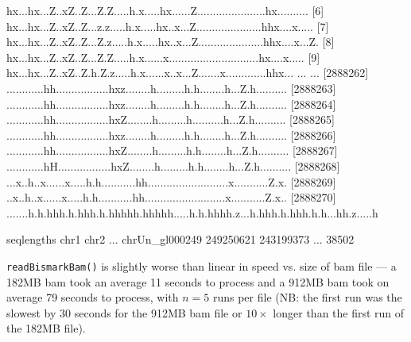 \documentclass[a4paper]{article}
\begin{document}
\begin{Schunk}
\begin{Soutput}
      [5] hx...hx...Z..xZ..Z...Z.Z.....h.x.....hx......Z......................hx..........
      [6] hx...hx...Z..xZ..Z...z.z.....h.x.....hx..x...Z.....................hhx....x.....
      [7] hx...hx...Z..xZ..Z...Z.z.....h.x.....hx..x...Z.....................hhx....x...Z.
      [8] hx...hx...Z..xZ..Z...Z.Z.....h.x......x.............................hx....x.....
      [9]        hx...hx...Z..xZ..Z.h.Z.z.....h.x......x..x...Z.......x.............hhx...
      ...                                                                              ...
[2888262] ............hh.................hxz........h.........h.h........h...Z.h..........
[2888263] ............hh.................hxz........h.........h.h........h...Z.h..........
[2888264] ............hh.................hxZ........h.........h..........h...Z.h..........
[2888265] ............hh.................hxz........h.........h.h........h...Z.h..........
[2888266] ............hh.................hxZ........h.........h.h........h...Z.h..........
[2888267] ............hH.................hxZ........h.........h.h........h...Z.h..........
[2888268] ...x..h..x......x.....h.h...........hh..........................x...........Z.x.
[2888269] ..x..h..x......x.....h.h...........hh..........................x...........Z.x..
[2888270] .......h.h.hhh.h.hhh.h.hhhhh.hhhhh.....h.h.hhhh.z...h.hhh.h.hhh.h.h...hh.z.....h

seqlengths
                  chr1                  chr2 ...        chrUn_gl000249
             249250621             243199373 ...                 38502
\end{Soutput}
\end{Schunk}
\texttt{readBismarkBam()} is slightly worse than linear in speed vs. size of bam file --- a 182MB bam took an average 11 seconds to process and a 912MB bam took on average 79 seconds to process, with $n=5$ runs per file (NB: the first run was the slowest by 30 seconds for the 912MB bam file or $10\times$ longer than the first run of the 182MB file).




\listoftodos
\end{document}
